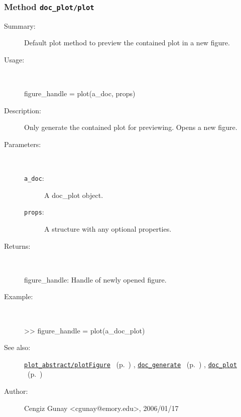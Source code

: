 \subsubsection[Method \texttt{plot}]{Method \texttt{doc\_plot/plot}}%
%
\label{ref_doc_plot__plot}%
\hypertarget{ref_doc_plot__plot}{}%
\begin{description}
\item[Summary:]Default plot method to preview the contained plot in a new figure.
%
\item[Usage:]~%
\begin{lyxcode}%
figure\_handle = plot(a\_doc, props)
%
\end{lyxcode}%
%
\item[Description:]%
Only generate the contained plot for previewing. Opens a new figure.
\item[Parameters:]~
\begin{description}%
\item[\texttt{a\_doc}:]
 A doc\_plot object.
\item[\texttt{props}:]
 A structure with any optional properties.
\end{description}%
%
\item[Returns:]~

	figure\_handle: Handle of newly opened figure.
%
\item[Example:]~
\begin{lyxcode}        >> figure\_handle = plot(a\_doc\_plot)\\%
\end{lyxcode}
%
\item[See also:]%
\hyperlink{ref_plot_abstract__plotFigure}{\texttt{plot\_abstract/plotFigure}}%
\ (p.~\pageref{ref_plot_abstract__plotFigure})%
%
, \hyperlink{ref_doc_generate}{\texttt{doc\_generate}}%
\ (p.~\pageref{ref_doc_generate})%
%
, \hyperlink{ref_doc_plot}{\texttt{doc\_plot}}%
\ (p.~\pageref{ref_doc_plot})%
%
%
\item[Author:]%
Cengiz Gunay <cgunay@emory.edu>, 2006/01/17%
\end{description}
\methodline%
